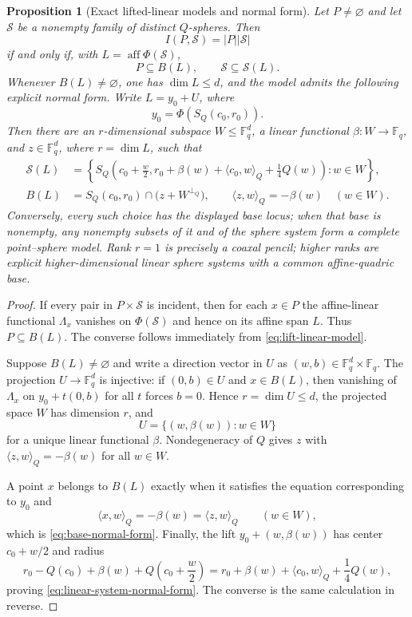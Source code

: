 \documentclass[11pt,letterpaper]{amsart}
\newtheorem{proposition}[proposition]{Proposition}
\theoremstyle{definition}
\theoremstyle{remark}
\newcommand{\1}{\mathbf 1}
\newcommand{\ip}[2]{\langle #1,#2\rangle_Q}
\begin{document}
\begin{proposition}[Exact lifted-linear models and normal form]\label{prop:linear-model-normal-form}
Let $P\ne\varnothing$ and let $\mathcal S$ be a nonempty family of distinct $Q$-spheres.  Then
\[
 I(P,\mathcal S)=|P||\mathcal S|
\]
if and only if, with $L=\operatorname{aff}\Phi(\mathcal S)$,
\[
 P\subseteq B(L),\qquad \mathcal S\subseteq\mathcal S(L).
\]
Whenever $B(L)\ne\varnothing$, one has $\dim L\le d$, and the model admits the following explicit normal form.  Write $L=y_0+U$, where
\[
 y_0=\Phi(S_Q(c_0,r_0)).
\]
Then there are an $r$-dimensional subspace $W\le\mathbb F_q^d$, a linear functional $\beta:W\to\mathbb F_q$, and $z\in\mathbb F_q^d$, where $r=\dim L$, such that
\begin{align}
 \mathcal S(L)
 &=\left\{
 S_Q\left(c_0+\frac w2,
 r_0+\beta(w)+\ip{c_0}{w}+\frac14Q(w)\right):w\in W
 \right\},\label{eq:linear-system-normal-form}\\
 B(L)
 &=S_Q(c_0,r_0)\cap\bigl(z+W^{\perp_Q}\bigr),
 \qquad
 \ip{z}{w}=-\beta(w)\quad(w\in W).
 \label{eq:base-normal-form}
\end{align}
Conversely, every such choice has the displayed base locus; when that base is nonempty, any nonempty subsets of it and of the sphere system form a complete point--sphere model.  Rank $r=1$ is precisely a coaxal pencil; higher ranks are explicit higher-dimensional linear sphere systems with a common affine-quadric base.
\end{proposition}

\begin{proof}
If every pair in $P\times\mathcal S$ is incident, then for each $x\in P$ the affine-linear functional $\Lambda_x$ vanishes on $\Phi(\mathcal S)$ and hence on its affine span $L$.  Thus $P\subseteq B(L)$.  The converse follows immediately from \eqref{eq:lift-linear-model}.

Suppose $B(L)\ne\varnothing$ and write a direction vector in $U$ as $(w,b)\in\mathbb F_q^d\times\mathbb F_q$.  The projection $U\to\mathbb F_q^d$ is injective: if $(0,b)\in U$ and $x\in B(L)$, then vanishing of $\Lambda_x$ on $y_0+t(0,b)$ for all $t$ forces $b=0$.  Hence $r=\dim U\le d$, the projected space $W$ has dimension $r$, and
\[
 U=\{(w,\beta(w)):w\in W\}
\]
for a unique linear functional $\beta$.  Nondegeneracy of $Q$ gives $z$ with $\ip{z}{w}=-\beta(w)$ for all $w\in W$.

A point $x$ belongs to $B(L)$ exactly when it satisfies the equation corresponding to $y_0$ and
\[
 \ip{x}{w}=-\beta(w)=\ip{z}{w}
 \qquad(w\in W),
\]
which is \eqref{eq:base-normal-form}.  Finally, the lift $y_0+(w,\beta(w))$ has center $c_0+w/2$ and radius
\[
 r_0-Q(c_0)+\beta(w)+Q\left(c_0+\frac w2\right)
 =r_0+\beta(w)+\ip{c_0}{w}+\frac14Q(w),
\]
proving \eqref{eq:linear-system-normal-form}.  The converse is the same calculation in reverse.
\end{proof}
\end{document}
